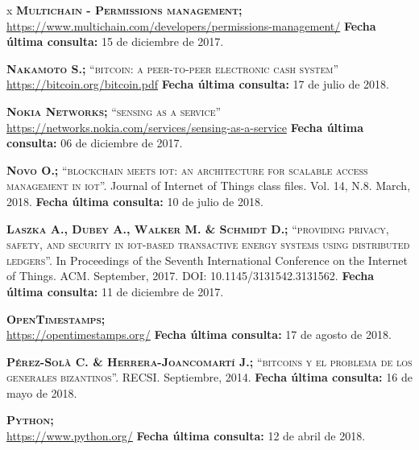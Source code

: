 \begin{thebibliography} {x}
	 \textsc{\textbf{Multichain - Permissions management; }} \\ 
	\url{https://www.multichain.com/developers/permissions-management/} 
	\newline \textbf{Fecha última consulta:} 15 de diciembre de 2017.
	
	 \textsc{\textbf{Nakamoto S.; }}\textsc{“bitcoin: a peer-to-peer electronic cash system”} \\ 
	\url{https://bitcoin.org/bitcoin.pdf}
	\newline \textbf{Fecha última consulta:} 17 de julio de 2018.
	
	 \textsc{\textbf{Nokia Networks; }}\textsc{“sensing as a service”} \\ 
	\url{https://networks.nokia.com/services/sensing-as-a-service}
	\newline \textbf{Fecha última consulta:} 06 de diciembre de 2017.
		
	 \textsc{\textbf{Novo O.; }} \textsc{“blockchain meets iot: an architecture for scalable access management in iot”.} Journal of Internet of Things class files. Vol. 14, N.8. March, 2018.	
	\newline \textbf{Fecha última consulta:} 10 de julio de 2018.
	
	 \textsc{\textbf{Laszka A., Dubey A., Walker M. \& Schmidt D.; }} \textsc{“providing privacy, safety, and security in iot-based transactive energy systems using distributed ledgers”.} In Proceedings of the Seventh International Conference on the Internet of Things. ACM. September, 2017. DOI: 10.1145/3131542.3131562.	
	\newline \textbf{Fecha última consulta:} 11 de diciembre de 2017.

	 \textsc{\textbf{OpenTimestamps; }} \\ 
	\url{https://opentimestamps.org/} 
	\newline \textbf{Fecha última consulta:} 17 de agosto de 2018.		
				
	 \textsc{\textbf{Pérez-Solà C. \& Herrera-Joancomartí J.; }} \textsc{“bitcoins y el problema de los generales bizantinos”.} RECSI. Septiembre, 2014.
	\newline \textbf{Fecha última consulta:} 16 de mayo de 2018.
	
	 \textsc{\textbf{Python; }} \\ 
	\url{https://www.python.org/}
	\newline \textbf{Fecha última consulta:} 12 de abril de 2018.
		

\end{thebibliography}
